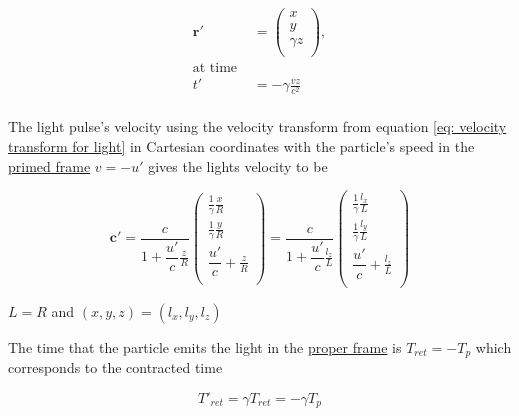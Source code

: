 \begin{equation}
	\label{eq: displacement transform}
	\begin{aligned}
		\mathbf{r}{'} & =
		\begin{pmatrix}
			x          \\
			y          \\
			{\gamma} z \\
		\end{pmatrix},                                  \\
		\text{at time \ \ \ }                           \\
		{t{'}}        & =-{\gamma} \frac{{v}{z}}{{c}^2} \\
	\end{aligned}
\end{equation}

The light pulse's velocity using the velocity transform from equation \eqref{eq: velocity transform for light} in Cartesian coordinates with the particle's speed in the \hyperlink{def-Primed-Frame}{primed frame} ${v} =-{u'}$ gives the lights velocity to be

\begin{equation}
	\label{eq: light pulse velocity transform}
	\mathbf{c}{'} = \dfrac{c}{1 + \dfrac{u'}{c} \frac{z}{R} }
	\begin{pmatrix}
		\frac{1}{\gamma} \frac{x}{R} \\
		\frac{1}{\gamma} \frac{y}{R} \\
		\dfrac{u'}{c} + \frac{z}{R}   \\
	\end{pmatrix}
	= \dfrac{c}{1 + \dfrac{u'}{c} \frac{l_z}{L} }
	\begin{pmatrix}
		\frac{1}{\gamma} \frac{l_x}{L} \\
		\frac{1}{\gamma} \frac{l_y}{L} \\
		\dfrac{u'}{c} + \frac{l_z}{L}   \\
	\end{pmatrix}
\end{equation}

$L=R$ and $(x,y,z)=(l_x,l_y,l_z)$


The time that the particle emits the light in the \hyperlink{def-proper-frame}{proper frame} is ${T}_{ret} =-{T}_{p}$ which corresponds to the contracted time

\begin{equation}
	T{'}_{ret} = {\gamma} {T}_{ret} =-{\gamma} {T}_{p}
\end{equation}

